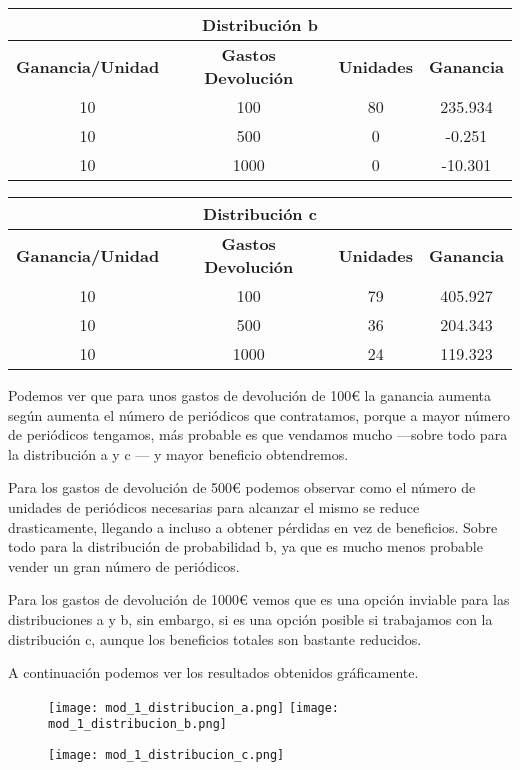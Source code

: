 \begin{table}[H]
\centering
\begin{tabular}{|c|c|c|c|}
\hline
\multicolumn{4}{|c|}{\textbf{Distribución b}} \\ \hline
\textbf{Ganancia/Unidad} & \textbf{Gastos Devolución} & \textbf{Unidades} & \textbf{Ganancia} \\ \hline
10 & 100 & 80 & 235.934 \\
10 & 500 & 0 & -0.251 \\
10 & 1000 & 0 & -10.301 \\ \hline
\end{tabular}
\end{table}

\begin{table}[H]
\centering
\begin{tabular}{|c|c|c|c|}
\hline
\multicolumn{4}{|c|}{\textbf{Distribución c}} \\ \hline
\textbf{Ganancia/Unidad} & \textbf{Gastos Devolución} & \textbf{Unidades} & \textbf{Ganancia} \\ \hline
10 & 100 & 79 & 405.927 \\
10 & 500 & 36 & 204.343 \\
10 & 1000 & 24 & 119.323 \\ \hline
\end{tabular}
\end{table}

Podemos ver que para unos gastos de devolución de 100€ la ganancia aumenta según aumenta el número de periódicos que contratamos, porque a mayor número de periódicos tengamos, más probable es que vendamos mucho ---sobre todo para la distribución a y c --- y mayor beneficio obtendremos.

Para los gastos de devolución de 500€ podemos observar como el número de unidades de periódicos necesarias para alcanzar el mismo se reduce drasticamente, llegando a incluso a obtener pérdidas en vez de beneficios. Sobre todo para la distribución de probabilidad b, ya que es mucho menos probable vender un gran número de periódicos.

Para los gastos de devolución de 1000€ vemos que es una opción inviable para las distribuciones a y b, sin embargo, si es una opción posible si trabajamos con la distribución c, aunque los beneficios totales son bastante reducidos.

A continuación podemos ver los resultados obtenidos gráficamente.

\begin{figure}[H]
	\centering
	\texttt{[image: mod\_1\_distribucion\_a.png]}
	\texttt{[image: mod\_1\_distribucion\_b.png]}
\end{figure}
\begin{figure}[H]
	\centering
	\texttt{[image: mod\_1\_distribucion\_c.png]}
\end{figure}

